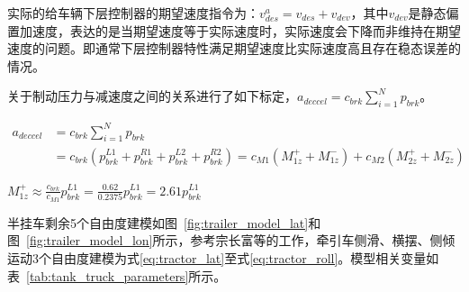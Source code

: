         实际的给车辆下层控制器的期望速度指令为：$v_{des}^a = v_{des} + v_{dev}$，其中$v_{dev}$是静态偏置加速度，表达的是当期望速度等于实际速度时，实际速度会下降而非维持在期望速度的问题。即通常下层控制器特性满足期望速度比实际速度高且存在稳态误差的情况。

        关于制动压力与减速度之间的关系进行了如下标定，$a_{deccel} = c_{brk} \sum_{i=1}^N p_{brk}$。





        \begin{equation}
        \begin{aligned}
        a_{deccel} &= c_{brk} \sum_{i=1}^N p_{brk} \\
        &= c_{brk}\left(p_{brk}^{L1} + p_{brk}^{R1} + p_{brk}^{L2} + p_{brk}^{R2}\right) = c_{M1}(M_{1z}^+ + M_{1z}^-) + c_{M2}(M_{2z}^+ + M_{2z}^-)
        \end{aligned}
        \end{equation}

        $M_{1z}^+ \approx \frac{c_{brk}}{c_{M1}} p_{brk}^{L1} = \frac{0.62}{0.2375} p_{brk}^{L1} = 2.61 p_{brk}^{L1}$

        半挂车剩余5个自由度建模如图~\ref{fig:trailer_model_lat}和图~\ref{fig:trailer_model_lon}所示，参考宗长富\cite{zongchangfu2014identification}等的工作，牵引车侧滑、横摆、侧倾运动3个自由度建模为式\eqref{eq:tractor_lat}至式\eqref{eq:tractor_roll}。模型相关变量如表~\ref{tab:tank_truck_parameters}所示。




